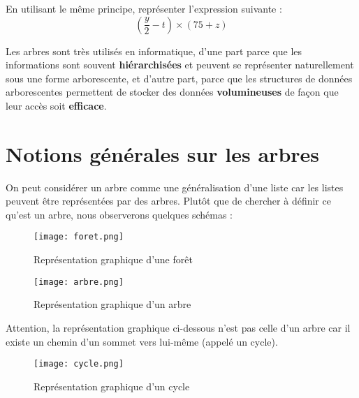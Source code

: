 \documentclass[french]{article}
\theoremstyle{plain}
\begin{document}
\vspace*{0.3cm}

En utilisant le même principe, représenter l'expression suivante : $$\left(\frac{y}{2} - t\right) \times (75 + z)$$


\begin{tcolorbox}[colback=blue!5!white,colframe=blue!75!black,title=Réponse :]
	
	\vspace*{9cm}
	
\end{tcolorbox}

\vspace*{0.3cm}

Les arbres sont très utilisés en informatique, d'une part parce que les informations sont souvent \textbf{hiérarchisées} et peuvent se représenter naturellement sous une forme arborescente, et d'autre part, parce que les structures de données arborescentes permettent de stocker des données \textbf{volumineuses} de façon que leur accès soit \textbf{efficace}.

\newpage

\section{Notions générales sur les arbres}

On peut considérer un arbre comme une généralisation d'une liste car les listes peuvent être représentées par des arbres. Plutôt que de chercher à définir ce qu'est un arbre, nous observerons quelques schémas :

	\begin{figure}[h]  %
	\centering
	\texttt{[image: foret.png]}
	\caption{Représentation graphique d'une forêt}
	\texttt{[image: arbre.png]}
	\caption{Représentation graphique d'un arbre}
	\end{figure}

Attention, la représentation graphique ci-dessous n'est pas celle d'un arbre car il existe un chemin d'un sommet vers lui-même (appelé un cycle).

	\begin{figure}[h]  %
	\centering
	\texttt{[image: cycle.png]}
	\caption{Représentation graphique d'un cycle}
	\end{figure}
\end{document}
